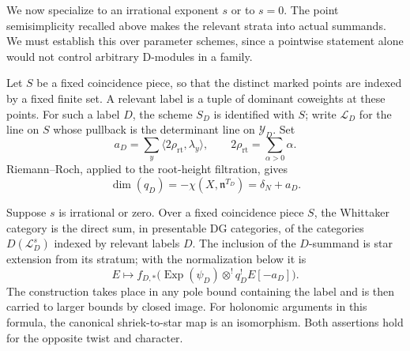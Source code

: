 We now specialize to an irrational exponent $s$ or to $s=0$. The point
semisimplicity recalled above makes the relevant strata into actual
summands. We must establish this over parameter schemes, since a
pointwise statement alone would not control arbitrary D-modules in a
family.

Let $S$ be a fixed coincidence piece, so that the distinct marked points
are indexed by a fixed finite set. A relevant label is a tuple of
dominant coweights at these points. For such a label $D$, the scheme
$S_D$ is identified with $S$; write $\mathcal L_D$ for the line on $S$
whose pullback is the determinant line on $\mathcal Y_D$. Set
\[
 a_D=\sum_y\langle 2\rho_{\mathrm{rt}},\lambda_y\rangle,
 \qquad 2\rho_{\mathrm{rt}}=\sum_{\alpha>0}\alpha.
\]
Riemann--Roch, applied to the root-height filtration, gives
\begin{equation}\label{whittaker:stratum-dimension}
 \dim(q_D)=-\chi(X,\mathfrak n^{T_D})=\delta_N+a_D.
\end{equation}

\begin{proposition}
\label{whittaker:standards}
Suppose $s$ is irrational or zero. Over a fixed coincidence piece $S$,
the Whittaker category is the direct sum, in presentable DG categories,
of the categories $D(\mathcal L_D^s)$ indexed by relevant labels $D$.
The inclusion of the $D$-summand is star extension from its stratum;
with the normalization below it is
\begin{equation}\label{eq:W3}
 E\longmapsto
 f_{D,*}\bigl(\operatorname{Exp}(\psi_D)\otimes^!q_D^!E[-a_D]\bigr).
\end{equation}
The construction takes place in any pole bound containing the label and
is then carried to larger bounds by closed image. For holonomic
arguments in this formula, the canonical shriek-to-star map is an
isomorphism. Both assertions hold for the opposite twist and character.
\end{proposition}

